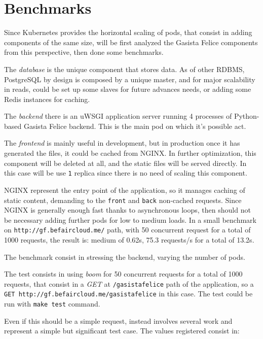 \section{Benchmarks}\label{benchmarks}

Since Kubernetes provides the horizontal scaling of pods, that consist in adding components of the same size, will be first analyzed the Gasista Felice components from this perspective, then done some benchmarks.

The \textit{database} is the unique component that stores data.  As of other RDBMS, PostgreSQL by design is composed by a unique master, and for major scalability in reads, could be set up some slaves for future advances needs, or adding some Redis instances for caching.

The \textit{backend} there is an uWSGI application server running 4 processes of Python-based Gasista Felice backend.  This is the main pod on which it's possible act.

The \textit{frontend} is mainly useful in development, but in production once it has generated the files, it could be cached from NGINX. In further optimization, this component will be deleted at all, and the static files will be served directly. In this case will be use \texttt{1} replica since there is no need of scaling this component.

NGINX  represent the entry point of the application, so it manages caching of static content, demanding to the \texttt{front} and \texttt{back} non-cached requests. Since NGINX is generally enough fast thanks to asynchronous loops, then should not be necessary adding further pods for low to medium loads.  In a small benchmark on \texttt{http://gf.befaircloud.me/} path, with 50 concurrent request for a total of 1000 requests, the result is:  medium of 0.62s, 75.3 requests/s for a total of 13.2s.

The benchmark consist in stressing the backend, varying the number of pods.

The test consists in using \textit{boom} for 50 concurrent requests for a total of 1000 requests, that consist in a \emph{GET} at \texttt{/gasistafelice} path of the application, so a \texttt{GET\ http://gf.befaircloud.me/gasistafelice} in this case.  The test could be run with \texttt{make test} command.

Even if this should be a simple request, instead involves several work and represent a simple but significant test case. The values registered consist in:

